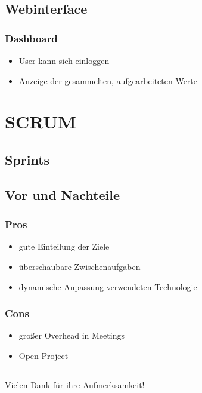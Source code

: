 \documentclass[11pt]{beamer}
\begin{document}
\subsection{Webinterface}
\begin{frame}
\frametitle{Dashboard}
	\begin{itemize}
	\item User kann sich einloggen
	\item Anzeige der gesammelten, aufgearbeiteten Werte
\end{itemize}
\end{frame}


\section{SCRUM}

\subsection{Sprints}





\subsection{Vor und Nachteile}
 
 \begin{frame}
 \frametitle{Pros}
 \begin{itemize}
 	\item gute Einteilung der Ziele
 	\item überschaubare Zwischenaufgaben
 	\item dynamische Anpassung verwendeten Technologie
 \end{itemize}
\end{frame}


 \begin{frame}
\frametitle{Cons}
\begin{itemize}
	\item großer Overhead in Meetings
	\item Open Project
\end{itemize}
\end{frame}

\subsection{}

\begin{frame}

	Vielen Dank für ihre Aufmerksamkeit!

\end{frame}
\end{document}
